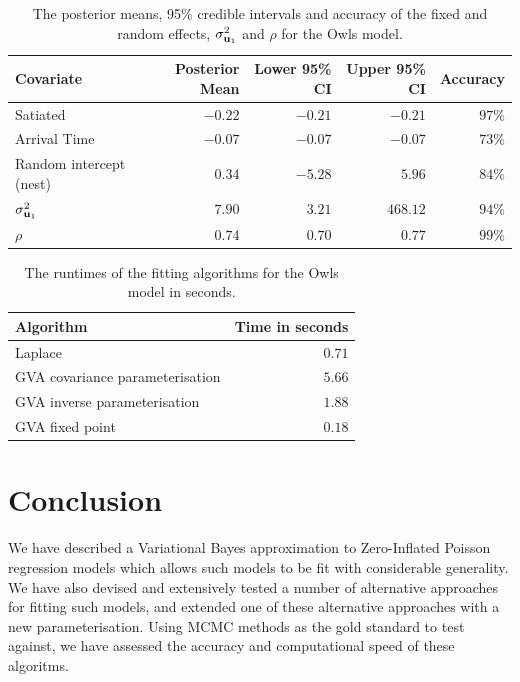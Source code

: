 \begin{table}
	\begin{tabular}{|l|rrrr|}
		\hline
		Covariate          & Posterior Mean & Lower 95\% CI & Upper 95\% CI & Accuracy \\
		\hline
		Satiated & $-0.22$ & $-0.21$ & $-0.21$ & $97\%$ \\
		Arrival Time & $-0.07$ & $-0.07$ & $-0.07$ & $73\%$ \\
		Random intercept (nest) & $0.34$ & $-5.28$ & $5.96$ & $84\%$ \\
		$\sigma_{{\bf u}_1}^2$ & $7.90$ & $3.21$ & $468.12$ & $94\%$ \\
		$\rho$ & $0.74$ & $0.70$ & $0.77$ & $99\%$ \\
		\hline
	\end{tabular}			
	\label{tab:owls_results}
	\caption{The posterior means, 95\% credible intervals and accuracy of the fixed and random
						effects, $\sigma_{{\bf u}_1}^2$ and $\rho$ for the Owls model.}
\end{table}

\begin{table}
	\begin{tabular}{|l|r|}
	\hline
	Algorithm & Time in seconds \\
	\hline
	Laplace & $0.71$ \\
	GVA covariance parameterisation & $5.66$ \\
	GVA inverse parameterisation & $1.88$ \\
	GVA fixed point & $0.18$ \\
	\hline
	\end{tabular}
	\caption{The runtimes of the fitting algorithms for the Owls model in seconds.}
	\label{tab:owls_times}
\end{table}

\section{Conclusion}
\label{sec:chapter_2_conclusion}
		
We have described a Variational Bayes approximation to Zero-Inflated Poisson
regression models which allows such models to be fit with considerable
generality. We have also devised and extensively tested a number of alternative
approaches for fitting such models, and extended one of these alternative
approaches with a new parameterisation. Using MCMC methods as the gold standard
to test against, we have assessed the accuracy and computational speed of these
algoritms.
		
